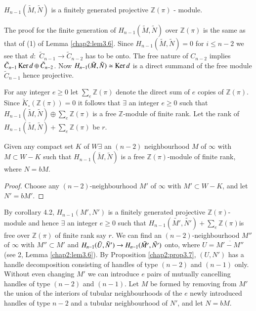 \setcounter{coro}{1}
\begin{coro}%
$H_{n-1} (\tilde{M}, \tilde{N})$ is a finitely generated
  projective $\mathbb{Z}(\pi)$ - module. 
\end{coro}

The proof for the finite generation of $H_{n-1} (\tilde{M},
\tilde{N})$ over $\mathbb{Z}(\pi)$ is the same as that of
(1) of Lemma \ref{chap2:lem3.6}. Since $H_{n-1} (\tilde{M}, \tilde{N}) =
0$ for $i \leq n-2$ we see that $d:$ $\tilde{C}_{n-1} \to
\tilde{C}_{n-2}$ has to be onto. The free nature of $C_{n-2}$ implies
$\tilde{C}_{n-1} \operatorname{Ker} d \oplus \tilde{C}_{n-2}$. Now
$H_{n-1}(\tilde{M}, \tilde{N}) \simeq \operatorname{Ker} d$ is a direct summand of
the free module $\tilde{C}_{n-1}$ hence projective.  

For any integer $e \geq 0$ let $\sum \limits_e \mathbb{Z}(\pi)$ denote
the direct sum of $e$ copies of $\mathbb{Z}(\pi)$. Since $\tilde{K}_\circ
(\mathbb{Z}(\pi))=0$ it follows that $\exists$ an integer $e \geq 0$
such that $H_{n-1}(\tilde{M}, \tilde{N}) \oplus \sum \limits_e
\mathbb{Z}(\pi)$ is a free $\mathbb{Z}$-module of finite rank. Let the
rank of $H_{n-1} (\tilde{M}, \tilde{N})+ \sum\limits_e
\mathbb{Z}(\pi)$ be $r$. 

\setcounter{lemma}{2}
\begin{lemma}\label{chap2:lem4.3}%
Given any compact set $K$ of $W \exists$ an $(n-2)$ neighbourhood $M$
of $\infty$ with $M \subset W-K$ such that $H_{n-1}(\tilde{M},
\tilde{N})$ is a free $\mathbb{Z} (\pi)$-module of finite rank, where
$N = bM$. 
\end{lemma}

\begin{proof}
Choose any $(n-2)$-neighbourhood $M'$ of $\infty$ with $M' \subset
W-K$, and let $N'= bM'$. 
\end{proof}

By corollary 4.2, $H_{n-1}(M', N')$ is a finitely generated projective\break
$\mathbb{Z}(\pi)$- module and hence $\exists$ an integer $e \geq 0$
such that $H_{n-1}(\tilde{M'}, \tilde{N'})+\sum \limits_e
\mathbb{Z}(\pi)$\pageoriginale is free over $\mathbb{Z}(\pi)$ of
finite rank say 
$r$. We can find an $(n-2)$-neighbourhood $M''$ of $\infty$ with $M''
\subset M'$ and $H_{n-1}(\tilde{U}, \tilde{N}')\to H_{n-1}
(\tilde{M'},\break \tilde{N'})$ onto, where $U= \overline{M'-M''}$(see 2,
Lemma \ref{chap2:lem3.6}). By Proposition \ref{chap2:prop3.7},
$(U,N')$ has a handle decomposition 
consisting of handles of type $(n-2)$ and $(n-1)$ only. Without even
changing $M'$ we can introduce $e$ pairs of mutually cancelling
handles of type $(n-2)$ and $(n-1)$. Let $M$ be formed by removing
from $M'$ the union of the interiors of tubular neighbourhoods of the
$e$ newly introduced handles of type $n-2$ and a tubular neighbourhood
of $N'$, and let $N= bM$. 


